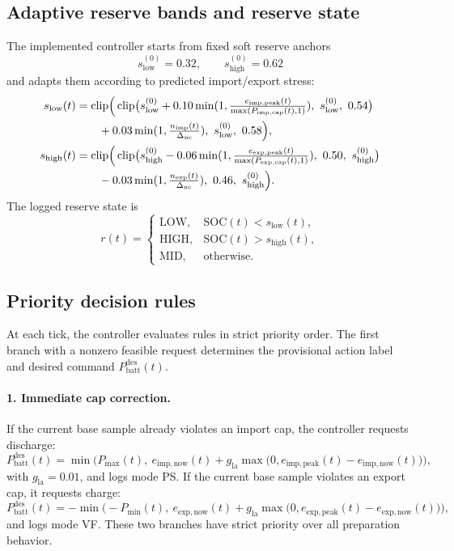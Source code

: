 \documentclass[preprint,12pt]{elsarticle}
\def\texttt#1{#1}%
\newcommand{\SOC}{\mathrm{SOC}}
\newcommand{\Pbatt}{P_{\mathrm{batt}}}
\DeclareMathOperator{\clip}{clip}
\begin{document}
\subsection{Adaptive reserve bands and reserve state}
The implemented controller starts from fixed soft reserve anchors
\[
s_{\mathrm{low}}^{(0)}=0.32,\qquad s_{\mathrm{high}}^{(0)}=0.62
\]
and adapts them according to predicted import/export stress:
\begin{align}
s_{\mathrm{low}}(t)
&= \clip\!\Big(
\clip\!\big(
s_{\mathrm{low}}^{(0)}
+ 0.10 \min(1,\tfrac{e_{\mathrm{imp,peak}}(t)}{\max(P_{\mathrm{imp,cap}}(t),1)}),
\ s_{\mathrm{low}}^{(0)},\ 0.54
\big) \notag\\
&\qquad
+ 0.03 \min(1,\tfrac{n_{\mathrm{imp}}(t)}{\Delta_{\mathrm{nc}}}),
\ s_{\mathrm{low}}^{(0)},\ 0.58
\Big), \\
s_{\mathrm{high}}(t)
&= \clip\!\Big(
\clip\!\big(
s_{\mathrm{high}}^{(0)}
- 0.06 \min(1,\tfrac{e_{\mathrm{exp,peak}}(t)}{\max(P_{\mathrm{exp,cap}}(t),1)}),
\ 0.50,\ s_{\mathrm{high}}^{(0)}
\big) \notag\\
&\qquad
- 0.03 \min(1,\tfrac{n_{\mathrm{exp}}(t)}{\Delta_{\mathrm{nc}}}),
\ 0.46,\ s_{\mathrm{high}}^{(0)}
\Big).
\end{align}
The logged reserve state is
\begin{equation}
r(t)=
\begin{cases}
\mathrm{LOW}, & \SOC(t)<s_{\mathrm{low}}(t),\\
\mathrm{HIGH}, & \SOC(t)>s_{\mathrm{high}}(t),\\
\mathrm{MID}, & \text{otherwise}.
\end{cases}
\end{equation}

\subsection{Priority decision rules}
At each tick, the controller evaluates rules in strict priority order. The first branch with a nonzero feasible request determines the provisional action label and desired command $\Pbatt^{\mathrm{des}}(t)$.

\paragraph{1. Immediate cap correction.}
If the current base sample already violates an import cap, the controller requests discharge:
\begin{equation}
\Pbatt^{\mathrm{des}}(t)=\min\!\Big(P_{\max}(t),\ e_{\mathrm{imp,now}}(t) + g_{\mathrm{la}}\max\big(0,e_{\mathrm{imp,peak}}(t)-e_{\mathrm{imp,now}}(t)\big)\Big),
\end{equation}
with $g_{\mathrm{la}}=0.01$, and logs mode \texttt{PS}. If the current base sample violates an export cap, it requests charge:
\begin{equation}
\Pbatt^{\mathrm{des}}(t)= -\min\!\Big(-P_{\min}(t),\ e_{\mathrm{exp,now}}(t) + g_{\mathrm{la}}\max\big(0,e_{\mathrm{exp,peak}}(t)-e_{\mathrm{exp,now}}(t)\big)\Big),
\end{equation}
and logs mode \texttt{VF}. These two branches have strict priority over all preparation behavior.
\end{document}
